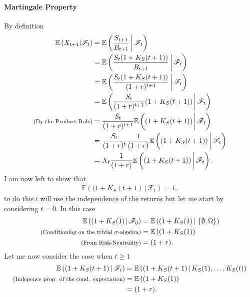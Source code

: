 \documentclass{article}
\theoremstyle{definition}
\numberwithin{equation}{section}
\begin{document}
\paragraph{Martingale Property}
By definition
\begin{align}
    \mathbb{E}\left(X_{t + 1} | \mathscr{F}_t\right) &= \mathbb{E}\left(\frac{S_{t + 1}}{B_{t + 1}} \, \bigg| \, \mathscr{F}_t\right) \\
    &= \mathbb{E}\left(\frac{S_{t}(1 + K_S(t + 1))}{B_{t + 1}} \, \bigg| \, \mathscr{F}_t\right) \\
    &= \mathbb{E}\left(\frac{S_{t}(1 + K_S(t + 1))}{(1 + r)^{t + 1}} \, \bigg| \, \mathscr{F}_t\right) \\
    &= \mathbb{E}\left(\frac{S_{t}}{(1 + r)^{t + 1}}(1 + K_S(t + 1)) \, \bigg| \, \mathscr{F}_t\right) \\
    \text{{\footnotesize (By the Product Rule)}} &= \frac{S_{t}}{(1 + r)^{t + 1}}\mathbb{E}\left((1 + K_S(t + 1)) \, \bigg| \, \mathscr{F}_t\right) \\
    &= \frac{S_{t}}{(1 + r)^{t}}\frac{1}{(1 + r)}\mathbb{E}\left((1 + K_S(t + 1)) \, \bigg| \, \mathscr{F}_t\right) \\
    &= X_t\frac{1}{(1 + r)}\mathbb{E}\left((1 + K_S(t + 1)) \, \bigg| \, \mathscr{F}_t\right).
\end{align}
I am now left to show that
\begin{align}
    \mathbb{E}\left((1 + K_S(t + 1) \, \bigg| \, \mathscr{F}_t\right) = 1,
\end{align}
to do this i will use the independence of the returns but let me start by considering $t = 0$.
In this case
\begin{align}
    \mathbb{E}\left((1 + K_S(1)\,|\,\mathscr{F}_0\right) &= \mathbb{E}\left((1 + K_S(1)\,|\,\left\{\emptyset, \Omega\right\}\right) \\
    \text{{\footnotesize (Conditioning on the trivial $\sigma$-algebra)}} &= \mathbb{E}\left((1 + K_S(1)\right) \\
    \text{{\footnotesize (From Risk-Neutrality)}}&= (1 + r).
\end{align}
Let me now consider the case when $t \geq 1$
\begin{align}
    \mathbb{E}\left((1 + K_S(t + 1)\,|\,\mathscr{F}_t\right) &= \mathbb{E}\left((1 + K_S(t + 1)\,|\,K_S(1),\ldots,K_S(t)\right) \\
    \text{{\footnotesize (Indepence prop. of the cond. expectation)}} &= \mathbb{E}\left((1 + K_S(1)\right) \\
    &= (1 + r).
\end{align}
\end{document}

